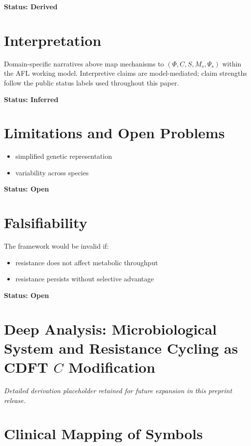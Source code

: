 \documentclass[11pt]{article}
\begin{document}
\textbf{Status: Derived}

\section{Interpretation}
Domain-specific narratives above map mechanisms to $(\Phi, C, S, M_s, \Psi_s)$ within the AFL working model. Interpretive claims are model-mediated; claim strengths follow the public status labels used throughout this paper.

\textbf{Status: Inferred}

\section{Limitations and Open Problems}

\begin{itemize}
    \item simplified genetic representation
    \item variability across species
\end{itemize}

\textbf{Status: Open}

\section{Falsifiability}

The framework would be invalid if:

\begin{itemize}
    \item resistance does not affect metabolic throughput
    \item resistance persists without selective advantage
\end{itemize}

\textbf{Status: Open}


\section{Deep Analysis: Microbiological System and Resistance Cycling as CDFT $C$ Modification}
\noindent\textit{Detailed derivation placeholder retained for future expansion in this preprint release.}

\section{Clinical Mapping of Symbols}
\end{document}
